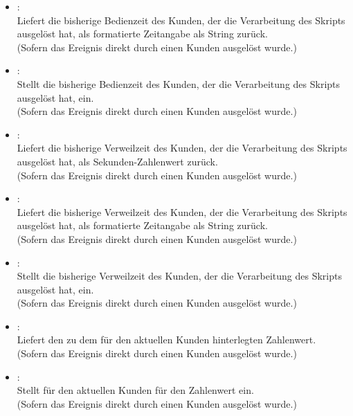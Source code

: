 \begin{itemize}
\item
{}:\\
Liefert die bisherige Bedienzeit des Kunden, der die Verarbeitung des Skripts ausgelöst hat, als formatierte Zeitangabe als String zurück.\\
(Sofern das Ereignis direkt durch einen Kunden ausgelöst wurde.)

\item
{}:\\
Stellt die bisherige Bedienzeit des Kunden, der die Verarbeitung des Skripts ausgelöst hat, ein.\\
(Sofern das Ereignis direkt durch einen Kunden ausgelöst wurde.)

\item
{}:\\
Liefert die bisherige Verweilzeit des Kunden, der die Verarbeitung des Skripts ausgelöst hat, als Sekunden-Zahlenwert zurück.\\
(Sofern das Ereignis direkt durch einen Kunden ausgelöst wurde.)

\item
{}:\\
Liefert die bisherige Verweilzeit des Kunden, der die Verarbeitung des Skripts ausgelöst hat, als formatierte Zeitangabe als String zurück.\\
(Sofern das Ereignis direkt durch einen Kunden ausgelöst wurde.)

\item
{}:\\
Stellt die bisherige Verweilzeit des Kunden, der die Verarbeitung des Skripts ausgelöst hat, ein.\\
(Sofern das Ereignis direkt durch einen Kunden ausgelöst wurde.)

\item
{}:\\
Liefert den zu dem  für den aktuellen Kunden hinterlegten Zahlenwert.\\
(Sofern das Ereignis direkt durch einen Kunden ausgelöst wurde.)
  
\item
{}:\\
Stellt für den aktuellen Kunden für  den Zahlenwert  ein.\\
(Sofern das Ereignis direkt durch einen Kunden ausgelöst wurde.)


\end{itemize}
